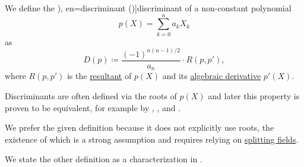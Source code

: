 \begin{definition}\label{def:discriminant}
  We define the \term[ru=дискриминант (\cite[141]{Винберг2014Алгебра}), en=discriminant (\cite[223]{Rotman2015AlgebraVol1})]{discriminant} of a non-constant polynomial
  \begin{equation*}
    p(X) = \sum_{k=0}^n a_k X_k
  \end{equation*}
  as
  \begin{equation*}
    D(p) \coloneqq \frac {(-1)^{n(n-1)/2}} {a_n} \cdot R(p, p'),
  \end{equation*}
  where \( R(p, p') \) is the \hyperref[def:resultant]{resultant} of \( p(X) \) and its \hyperref[def:algebraic_derivative]{algebraic derivative} \( p'(X) \).
\end{definition}
\begin{comments}
  \item Discriminants are often defined via the roots of \( p(X) \) and later this property is proven to be equivalent, for example by
  ,
  ,
   and
  .

  We prefer the given definition because it does not explicitly use roots, the existence of which is a strong assumption and requires relying on \hyperref[def:splitting_field]{splitting fields}.

  We state the other definition as a characterization in .
\end{comments}

